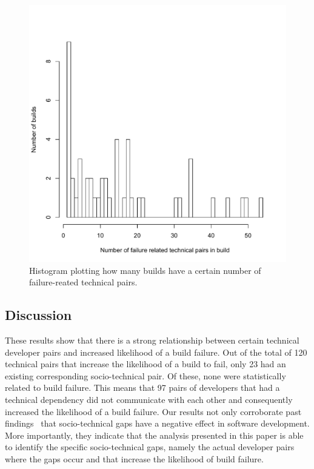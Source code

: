 \documentclass[12pt,oneside]{book}
\begin{document}
\begin{figure}[t]
\centering
\vspace{-1cm}
\includegraphics[width=\columnwidth]{figures/builddistribution}
\vspace{-.75cm}
\caption{Histogram plotting how many builds have a certain number of failure-reated technical pairs.}
\label{fig:builddistribution}
\end{figure}

\subsection{Discussion}
These results show that there is a strong relationship between certain technical
developer pairs and increased likelihood of a build failure.
Out of the total of 120 technical pairs that increase the likelihood of a
build to fail, only 23 had an existing
corresponding socio-technical pair. Of these, none were statistically
related to build failure. This means that 97 pairs of developers that had a
technical dependency did not communicate with each other and
consequently increased the likelihood of a build failure. Our results not only
corroborate past findings~\cite{cataldo:cscw:2006,cataldo:esem:2008} that socio-technical gaps
have a negative effect in software development. More importantly, they indicate
that the analysis presented in this paper is able to identify the specific
socio-technical gaps, namely the actual developer pairs where the gaps occur
and that increase the likelihood of build failure. 
\end{document}
